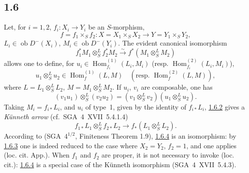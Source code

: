 \documentclass[11pt]{article}
\DeclareMathOperator{\Hom}{Hom}
\newcommand{\ob}{\operatorname{ob}}
\providecommand{\Hom}{\operatorname{Hom}}
\providecommand{\ob}{\operatorname{ob}}
\providecommand{\Hom}{\operatorname{Hom}}
\begin{document}
\subsection*{1.6}\label{sga5:III:subsection:1.6}
Let, for $i=1,2$, $f_i:X_i\to Y_i$ be an $S$-morphism,
\[
f=f_1\times_Sf_2:X=X_1\times_SX_2\to Y=Y_1\times_SY_2,
\]
$L_i\in\ob D^{-}(X_i)$, $M_i\in\ob D^{-}(Y_i)$. The evident canonical isomorphism
\begin{equation}\tag{1.6.1}\label{sga5:III:equation:1.6.1}
f_1^{*}M_1\otimes^L_Sf_2^{*}M_2\xrightarrow{\sim}f^{*}(M_1\otimes^L_SM_2)
\end{equation}
allows one to define, for $u_i\in\Hom_{f_i}^{(1)}(L_i,M_i)$ (resp. $\Hom_{f_i}^{(2)}(L_i,M_i)$),
\begin{equation}\tag{1.6.2}\label{sga5:III:equation:1.6.2}
u_1\otimes^L_Su_2\in\Hom_f^{(1)}(L,M)\quad(\text{resp. }\Hom_f^{(2)}(L,M)),
\end{equation}
where $L=L_1\otimes^L_SL_2$, $M=M_1\otimes^L_SM_2$. If $u_i$, $v_i$ are composable, one has
\begin{equation}\tag{1.6.3}\label{sga5:III:equation:1.6.3}
(v_1u_1)\otimes^L_S(v_2u_2)=(v_1\otimes^L_Sv_2)(u_1\otimes^L_Su_2).
\end{equation}
Taking $M_i=f_{i*}L_i$, and $u_i$ of type~1, given by the identity of $f_{i*}L_i$, \hyperref[sga5:III:equation:1.6.2]{1.6.2} gives a \emph{Künneth arrow} (cf.~SGA~4~XVII~5.4.1.4)
\begin{equation}\tag{1.6.4}\label{sga5:III:equation:1.6.4}
f_{1*}L_1\otimes^L_Sf_{2*}L_2\longrightarrow f_{*}(L_1\otimes^L_SL_2).
\end{equation}
According to (SGA~$4^{1/2}$, Finiteness Theorem 1.9), \hyperref[sga5:III:equation:1.6.4]{1.6.4} is an isomorphism: by \hyperref[sga5:III:equation:1.6.3]{1.6.3} one is indeed reduced to the case where $X_2=Y_2$, $f_2=1$, and one applies (loc. cit. App.). When $f_1$ and $f_2$ are proper, it is not necessary to invoke (loc. cit.): \hyperref[sga5:III:equation:1.6.4]{1.6.4} is a special case of the Künneth isomorphism (SGA~4~XVII~5.4.3).
\end{document}
